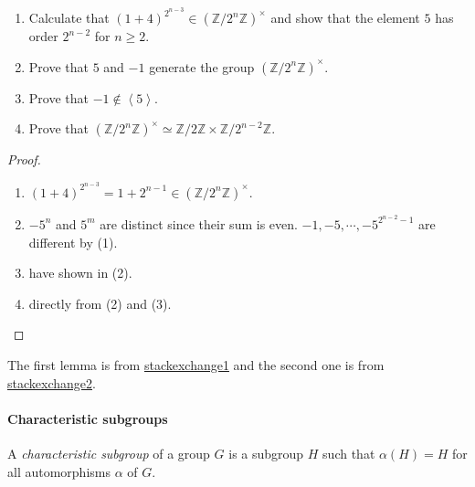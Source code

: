 \begin{lemma}
  \begin{enumerate}
    \item Calculate that \( (1 + 4)^{2^{n - 3}} \in (\mathbb{Z} / 2^n \mathbb{Z})^\times \) and show that the element \( 5 \) has order \( 2^{n - 2} \) for \( n \geq 2 \).
    \item Prove that \( 5 \) and \( -1 \) generate the group \( (\mathbb{Z} / 2^n \mathbb{Z})^{\times} \).
    \item Prove that \( -1 \notin \left\langle 5 \right\rangle \).
    \item Prove that \( (\mathbb{Z} / 2^n\mathbb{Z})^{\times} \simeq \mathbb{Z} / 2 \mathbb{Z} \times \mathbb{Z} / 2^{n - 2} \mathbb{Z}  \).
  \end{enumerate}
\end{lemma}
\begin{proof}
  \begin{enumerate}
    \item \( (1 + 4)^{2^{n - 3}} = 1 + 2^{n - 1} \in (\mathbb{Z} / 2^n \mathbb{Z})^\times \).
    \item  \( -5^n \) and \( 5^m \) are distinct since their sum is even.
      \( -1, -5, \cdots, -5^{2^{n - 2} - 1} \) are different by (1).
    \item have shown in (2).
    \item directly from (2) and (3).
  \end{enumerate}
\end{proof}

\begin{remark}
  The first lemma is from \href{https://math.stackexchange.com/questions/238414/showing-1p-is-an-element-of-order-pn-1-in-mathbbz-pn-mathbbz-t}{stackexchange1} and the second one is from \href{https://math.stackexchange.com/questions/459815/the-structure-of-the-group-mathbbz-2n-mathbbz}{stackexchange2}.
\end{remark}

\paragraph{Characteristic subgroups}

\begin{definition}
  A \emph{characteristic subgroup} of a group \( G \) is a subgroup \( H \) such that \( \alpha(H) = H \) for all automorphisms \( \alpha \) of \( G \).
\end{definition}

